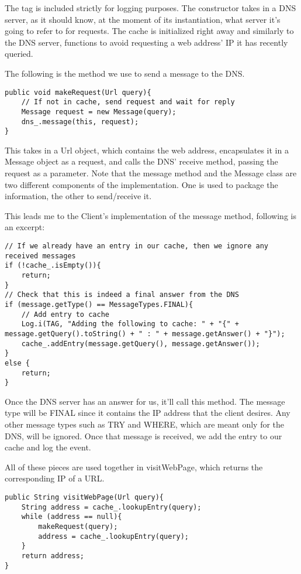 \documentclass[a4paper, 12pt]{article} %
\begin{document}
The tag is included strictly for logging purposes. The constructor takes in a DNS server, as it should know, at the moment of its instantiation, what server it's going to refer to for requests. The cache is initialized right away and similarly to the DNS server, functions to avoid requesting a web address' IP it has recently queried. 

The following is the method we use to send a message to the DNS.

\begin{lstlisting}
public void makeRequest(Url query){
	// If not in cache, send request and wait for reply
	Message request = new Message(query);
	dns_.message(this, request);
}
\end{lstlisting}

This takes in a Url object, which contains the web address, encapsulates it in a Message object as a request, and calls the DNS' receive method, passing the request as a parameter. Note that the message method and the Message class are two different components of the implementation. One is used to package the information, the other to send/receive it. 

This leads me to the Client's implementation of the message method, following is an excerpt:

\begin{lstlisting}
// If we already have an entry in our cache, then we ignore any received messages
if (!cache_.isEmpty()){
    return; 
}
// Check that this is indeed a final answer from the DNS
if (message.getType() == MessageTypes.FINAL){
	// Add entry to cache
    Log.i(TAG, "Adding the following to cache: " + "{" + message.getQuery().toString() + " : " + message.getAnswer() + "}");
    cache_.addEntry(message.getQuery(), message.getAnswer());
}
else {
    return;
}
\end{lstlisting}

Once the DNS server has an answer for us, it'll call this method. The message type will be FINAL since it contains the IP address that the client desires. Any other message types such as TRY and WHERE, which are meant only for the DNS, will be ignored. Once that message is received, we add the entry to our cache and log the event. 

All of these pieces are used together in visitWebPage, which returns the corresponding IP of a URL.

\begin{lstlisting}
public String visitWebPage(Url query){
    String address = cache_.lookupEntry(query);
    while (address == null){
    	makeRequest(query);
    	address = cache_.lookupEntry(query);
    }
    return address;
}	
\end{lstlisting}
\end{document}
